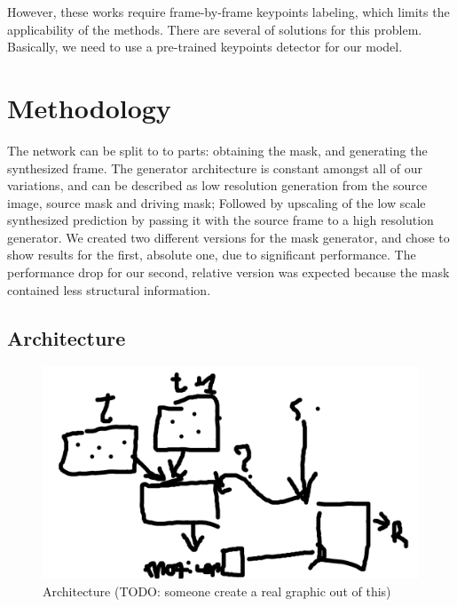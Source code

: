 \documentclass{article}
\begin{document}
However, these works require frame-by-frame keypoints labeling,
which limits the applicability of the methods.
There are several of solutions for this problem.
Basically, we need to use a pre-trained keypoints detector for our model.
\cite{siarohin2019animating} \cite{thewlis2017unsupervised}
\cite{zhang2018unsupervised} \cite{jakab2018unsupervised}
\cite{newell2016stacked}

\section{Methodology}
The network can be split to to parts: obtaining the mask, and generating
the synthesized frame. The generator architecture is constant amongst all of
our variations, and can be described as low resolution generation from the
source image, source mask and driving mask; Followed by upscaling of the
low scale synthesized prediction by passing it with the source frame to a
high resolution generator.
We created two different versions for the mask generator, and chose to show
results for the first, absolute one, due to significant performance. The
performance drop for our second, relative version was expected because the
mask contained less structural information.

\subsection{Architecture}
\label{method}

\begin{figure}[ht]
\vskip 0.2in
\begin{center}
\centerline{\includegraphics[width=\columnwidth]{second_meeting_pres}}
\caption{
Architecture (TODO: someone create a real graphic out of this)
}
\label{arch}
\end{center}
\vskip -0.2in
\end{figure}
\end{document}
